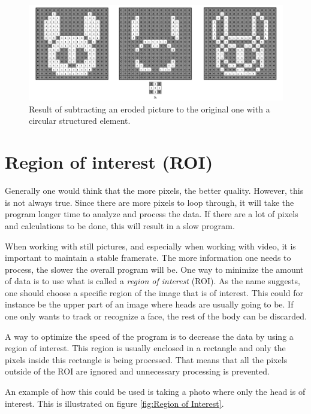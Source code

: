 {%
\begin{figure}[htbp]
\centering
\includegraphics[width=1\textwidth]{Pictures/Theory/BoundaryEdges_circ.png}
\caption{Result of subtracting an eroded picture to the original one with a circular structured element.}
\label{fig:Boundary}
\end{figure}

\section{Region of interest (ROI)}
Generally one would think that the more pixels, the better quality. However, this is not always true. Since there are more pixels to loop through, it will take the program longer time to analyze and process the data. If there are a lot of pixels and calculations to be done, this will result in a slow program.

When working with still pictures, and especially when working with video, it is important to maintain a stable framerate. The more information one needs to process, the slower the overall program will be. One way to minimize the amount of data is to use what is called a \textit{region of interest} (ROI). As the name suggests, one should choose a specific region of the image that is of interest. This could for instance be the upper part of an image where heads are usually going to be. If one only wants to track or recognize a face, the rest of the body can be discarded.

A way to optimize the speed of the program is to decrease the data by using a region of interest. This region is usually enclosed in a rectangle and only the pixels inside this rectangle is being processed. That means that all the pixels outside of the ROI are ignored and unnecessary processing is prevented.

An example of how this could be used is taking a photo where only the head is of interest. This is illustrated on figure \ref{fig:Region of Interest}.

}
